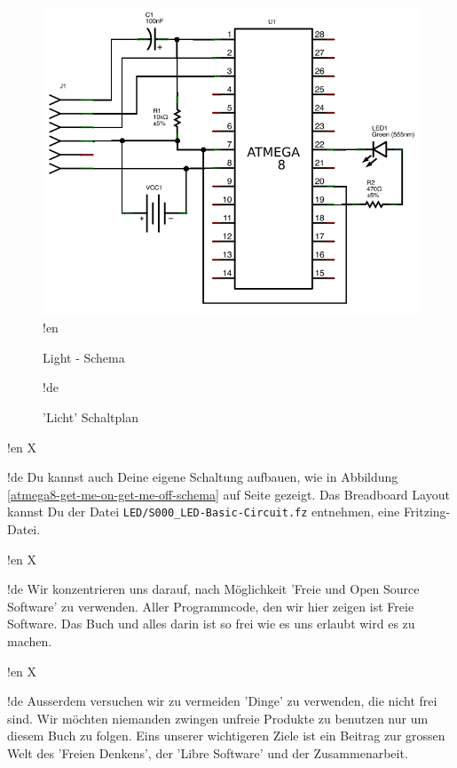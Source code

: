 \documentclass[twoside,12pt,authoryear,openright]{book}
\begin{document}
\begin{figure}[htbp]
  \centering
  \includegraphics[width=120mm]{LED/S000_let-there-be-light/schema_circuit.png}
!en  \caption{Light - Schema}
!de  \caption{'Licht' Schaltplan}
  \label{atmega8-let-there-be-light-schema}
\end{figure}



!en X

!de Du kannst auch Deine eigene Schaltung aufbauen, wie in Abbildung \ref{atmega8-get-me-on-get-me-off-schema} auf Seite \pageref{atmega8-get-me-on-get-me-off-schema} gezeigt. Das Breadboard Layout kannst Du der Datei \texttt{LED/S000\_LED-Basic-Circuit.fz} entnehmen, eine Fritzing-Datei.



!en X

!de Wir konzentrieren uns darauf, nach Möglichkeit 'Freie und Open Source Software' zu verwenden. Aller Programmcode, den wir hier zeigen ist Freie Software. Das Buch und alles darin ist so frei wie es uns erlaubt wird es zu machen.



!en X

!de Ausserdem versuchen wir zu vermeiden 'Dinge' zu verwenden, die nicht frei sind. Wir möchten niemanden zwingen unfreie Produkte zu benutzen nur um diesem Buch zu folgen. Eins unserer wichtigeren Ziele ist ein Beitrag zur grossen Welt des 'Freien Denkens', der 'Libre Software' und der Zusammenarbeit.








\end{document}
